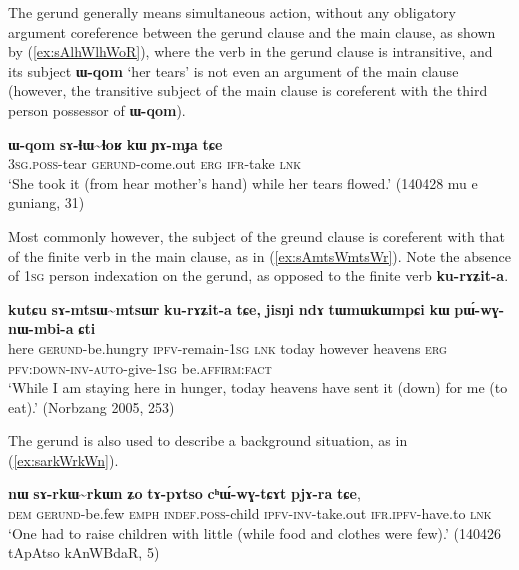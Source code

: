 \documentclass[oneside,a4paper,11pt]{article}
\newcommand{\ipa}[1]{\textbf{{\phon\mbox{#1}}}} %
\begin{document}
The gerund generally means simultaneous action, without any obligatory argument coreference between the gerund clause and the main clause, as shown by (\ref{ex:sAlhWlhWoR}), where the verb in the gerund clause is intransitive, and its subject \ipa{ɯ-qom} `her tears' is not even an argument of the main clause (however, the transitive subject of the main clause is coreferent with the third person possessor of \ipa{ɯ-qom}).  

\begin{exe}
\ex \label{ex:sAlhWlhWoR}
\gll  \ipa{ɯ-qom} \ipa{sɤ-ɬɯ\textasciitilde{}ɬoʁ} \ipa{kɯ} \ipa{ɲɤ-mɟa} \ipa{tɕe} \\
\textsc{3sg}.\textsc{poss}-tear  \textsc{gerund}-come.out \textsc{erg} \textsc{ifr}-take \textsc{lnk} \\
\glt  `She took it (from hear mother's hand) while her tears flowed.' (140428 mu e guniang, 31)
\end{exe}


Most commonly however, the subject of the greund clause is coreferent with that of the finite verb in the main clause, as in (\ref{ex:sAmtsWmtsWr}). Note the absence of \textsc{1sg} person indexation on the gerund, as opposed to the finite verb \ipa{ku-rɤʑit-a}.

\begin{exe}
\ex \label{ex:sAmtsWmtsWr}
\gll  \ipa{kutɕu}  	\ipa{sɤ-mtsɯ\textasciitilde{}mtsɯr}  	\ipa{ku-rɤʑit-a}  	\ipa{tɕe,}  	\ipa{jisŋi}  	\ipa{ndɤ}  	\ipa{tɯmɯkɯmpɕi}  	\ipa{kɯ}  	\ipa{pɯ́-wɣ-nɯ-mbi-a}  	\ipa{ɕti}  \\
 here \textsc{gerund}-be.hungry \textsc{ipfv}-remain-\textsc{1sg} \textsc{lnk} today however heavens \textsc{erg} \textsc{pfv:down-inv-auto}-give-\textsc{1sg} be.\textsc{affirm}:\textsc{fact} \\
\glt `While I am staying here in hunger, today heavens have sent it (down) for  me (to eat).' (Norbzang 2005, 253)
\end{exe}

The gerund is also used to describe a background situation, as in (\ref{ex:sarkWrkWn}).

 \begin{exe}
\ex \label{ex:sarkWrkWn}
\gll 
\ipa{nɯ} \ipa{sɤ-rkɯ\textasciitilde{}rkɯn} \ipa{ʑo} \ipa{tɤ-pɤtso} \ipa{cʰɯ́-wɣ-tɕɤt} \ipa{pjɤ-ra} \ipa{tɕe},  \\
\textsc{dem} \textsc{gerund}-be.few \textsc{emph} \textsc{indef}.\textsc{poss}-child \textsc{ipfv}-\textsc{inv}-take.out \textsc{ifr}.\textsc{ipfv}-have.to \textsc{lnk} \\
\glt `One had to raise children with little (while food and clothes were few).' (140426 tApAtso kAnWBdaR, 5)
\end{exe}
\end{document}
